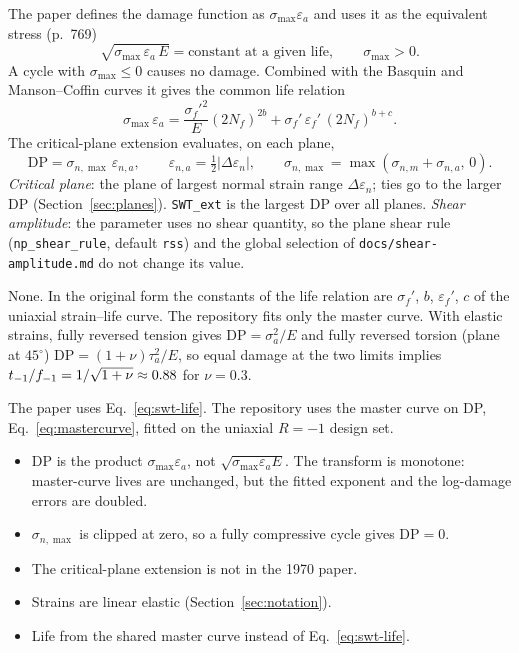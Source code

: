  The paper defines the damage function as $\sigma_{\max}\varepsilon_a$ and uses
it as the equivalent stress (p.~769)
\begin{equation}
\sqrt{\sigma_{\max}\,\varepsilon_a\,E} = \text{constant at a given life},
\qquad \sigma_{\max}>0 .
\label{eq:swt-main}
\end{equation}
A cycle with $\sigma_{\max}\le0$ causes no damage. Combined with the Basquin and Manson--Coffin
curves it gives the common life relation
\begin{equation}
\sigma_{\max}\,\varepsilon_a = \frac{\sigma_f'^2}{E}(2N_f)^{2b} + \sigma_f'\,\varepsilon_f'\,(2N_f)^{b+c} .
\label{eq:swt-life}
\end{equation}
The critical-plane extension evaluates, on each plane,
\begin{equation}
\mathrm{DP} = \sigma_{n,\max}\,\varepsilon_{n,a},\qquad
\varepsilon_{n,a} = \tfrac12\lvert\Delta\varepsilon_n\rvert,\qquad
\sigma_{n,\max} = \max(\sigma_{n,m}+\sigma_{n,a},\,0) .
\label{eq:swt-plane}
\end{equation}
\emph{Critical plane}: the plane of largest normal strain range $\Delta\varepsilon_n$; ties go to
the larger DP (Section~\ref{sec:planes}). \texttt{SWT\_ext} is the largest DP over all planes.
\emph{Shear amplitude}: the parameter uses no shear quantity, so the plane shear rule
(\texttt{np\_shear\_rule}, default \texttt{rss}) and the global selection of
\texttt{docs/shear-amplitude.md} do not change its value.

 None. In the original form the constants of the life relation
are $\sigma_f'$, $b$, $\varepsilon_f'$, $c$ of the uniaxial strain--life curve. The repository fits
only the master curve. With elastic strains, fully reversed tension gives $\mathrm{DP}=\sigma_a^2/E$
and fully reversed torsion (plane at $45^\circ$) $\mathrm{DP}=(1+\nu)\tau_a^2/E$, so equal damage at
the two limits implies $t_{-1}/f_{-1} = 1/\sqrt{1+\nu}\approx0.88$ for $\nu=0.3$.

 The paper uses Eq.~\eqref{eq:swt-life}. The repository uses the master curve on DP,
Eq.~\eqref{eq:mastercurve}, fitted on the uniaxial $R=-1$ design set.

\begin{itemize}
\item DP is the product $\sigma_{\max}\varepsilon_a$, not $\sqrt{\sigma_{\max}\varepsilon_a E}$. The
  transform is monotone: master-curve lives are unchanged, but the fitted exponent and the
  log-damage errors are doubled.
\item $\sigma_{n,\max}$ is clipped at zero, so a fully compressive cycle gives $\mathrm{DP}=0$.
\item The critical-plane extension is not in the 1970 paper.
\item Strains are linear elastic (Section~\ref{sec:notation}).
\item Life from the shared master curve instead of Eq.~\eqref{eq:swt-life}.
\end{itemize}

